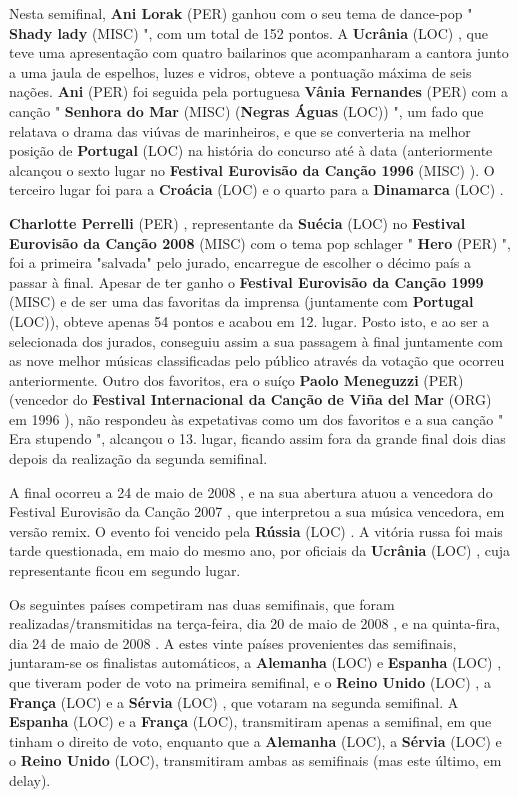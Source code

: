 \documentclass[12pt,a4paper]{article}
\begin{document}
Nesta semifinal, \textbf{Ani Lorak} (PER) ganhou com o seu tema de dance-pop " \textbf{Shady lady} (MISC) ", com um total de 152 pontos. A \textbf{Ucrânia} (LOC) , que teve uma apresentação com quatro bailarinos que acompanharam a cantora junto a uma jaula de espelhos, luzes e vidros, obteve a pontuação máxima de seis nações. \textbf{Ani} (PER) foi seguida pela portuguesa \textbf{Vânia Fernandes} (PER) com a canção " \textbf{Senhora do Mar} (MISC) (\textbf{Negras Águas} (LOC)) ", um fado que relatava o drama das viúvas de marinheiros, e que se converteria na melhor posição de \textbf{Portugal} (LOC) na história do concurso até à data (anteriormente alcançou o sexto lugar no \textbf{Festival Eurovisão da Canção 1996} (MISC) ). O terceiro lugar foi para a \textbf{Croácia} (LOC) e o quarto para a \textbf{Dinamarca} (LOC) .

\textbf{Charlotte Perrelli} (PER) , representante da \textbf{Suécia} (LOC) no \textbf{Festival Eurovisão da Canção 2008} (MISC) com o tema pop schlager " \textbf{Hero} (PER) ", foi a primeira "salvada" pelo jurado, encarregue de escolher o décimo país a passar à final. Apesar de ter ganho o \textbf{Festival Eurovisão da Canção 1999} (MISC) e de ser uma das favoritas da imprensa (juntamente com \textbf{Portugal} (LOC)), obteve apenas 54 pontos e acabou em 12. lugar. Posto isto, e ao ser a selecionada dos jurados, conseguiu assim a sua passagem à final juntamente com as nove melhor músicas classificadas pelo público através da votação que ocorreu anteriormente. Outro dos favoritos, era o suíço \textbf{Paolo Meneguzzi} (PER) (vencedor do \textbf{Festival Internacional da Canção de Viña del Mar} (ORG) em 1996 ), não respondeu às expetativas como um dos favoritos e a sua canção " Era stupendo ", alcançou o 13. lugar, ficando assim fora da grande final dois dias depois da realização da segunda semifinal.

A final ocorreu a 24 de maio de 2008 , e na sua abertura atuou a vencedora do Festival Eurovisão da Canção 2007 , que interpretou a sua música vencedora, em versão remix. O evento foi vencido pela \textbf{Rússia} (LOC) . A vitória russa foi mais tarde questionada, em maio do mesmo ano, por oficiais da \textbf{Ucrânia} (LOC) , cuja representante ficou em segundo lugar.

Os seguintes países competiram nas duas semifinais, que foram realizadas/transmitidas na terça-feira, dia 20 de maio de 2008 , e na quinta-fira, dia 24 de maio de 2008 . A estes vinte países provenientes das semifinais, juntaram-se os finalistas automáticos, a \textbf{Alemanha} (LOC) e \textbf{Espanha} (LOC) , que tiveram poder de voto na primeira semifinal, e o \textbf{Reino Unido} (LOC) , a \textbf{França} (LOC) e a \textbf{Sérvia} (LOC) , que votaram na segunda semifinal. A \textbf{Espanha} (LOC) e a \textbf{França} (LOC), transmitiram apenas a semifinal, em que tinham o direito de voto, enquanto que a \textbf{Alemanha} (LOC), a \textbf{Sérvia} (LOC) e o \textbf{Reino Unido} (LOC), transmitiram ambas as semifinais (mas este último, em delay).
\end{document}
